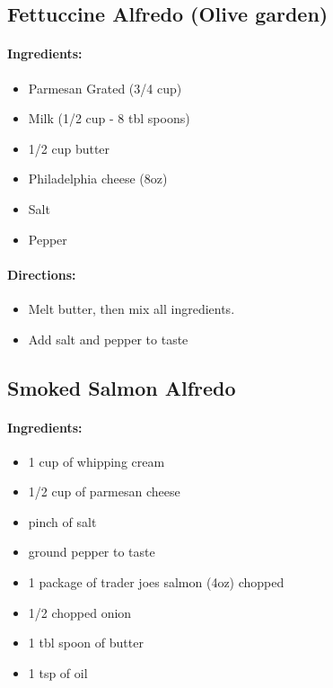 \documentclass{article}
\begin{document}
\subsection{Fettuccine Alfredo (Olive garden)}

\paragraph{Ingredients:}
\begin{itemize}
    \item Parmesan Grated (3/4 cup)
    \item Milk (1/2 cup - 8 tbl spoons)
    \item 1/2 cup butter
    \item Philadelphia cheese (8oz)
    \item Salt
    \item Pepper
\end{itemize}

\paragraph{Directions:}
\begin{itemize}
    \item Melt butter, then mix all ingredients.
    \item Add salt and pepper to taste
\end{itemize}

\subsection{Smoked Salmon Alfredo}

\paragraph{Ingredients:}
\begin{itemize}
    \item 1 cup of whipping cream
    \item 1/2 cup of parmesan cheese
    \item pinch of salt
    \item ground pepper to taste
    \item 1 package of trader joes salmon (4oz) chopped
    \item 1/2 chopped onion
    \item 1 tbl spoon of butter
    \item 1 tsp of oil
\end{itemize}
\end{document}

